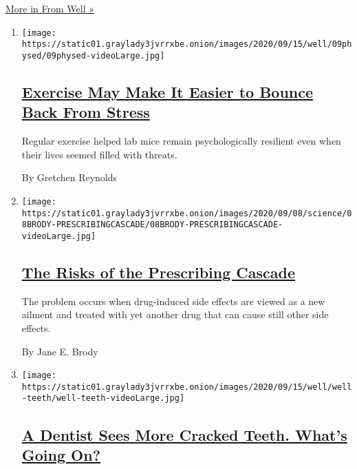 \href{/section/well}{More in From Well »}

\begin{enumerate}
\def\labelenumi{\arabic{enumi}.}
\item
  \texttt{[image: https://static01.graylady3jvrrxbe.onion/images/2020/09/15/well/09physed/09physed-videoLarge.jpg]}

  \hypertarget{exercise-may-make-it-easier-to-bounce-back-from-stress}{%
  \subsection{\texorpdfstring{\href{/2020/09/09/well/move/Exercise-stress-resilience.html}{Exercise
  May Make It Easier to Bounce Back From
  Stress}}{Exercise May Make It Easier to Bounce Back From Stress}}\label{exercise-may-make-it-easier-to-bounce-back-from-stress}}

  Regular exercise helped lab mice remain psychologically resilient even
  when their lives seemed filled with threats.

  By Gretchen Reynolds
\item
  \texttt{[image: https://static01.graylady3jvrrxbe.onion/images/2020/09/08/science/08BRODY-PRESCRIBINGCASCADE/08BRODY-PRESCRIBINGCASCADE-videoLarge.jpg]}

  \hypertarget{the-risks-of-the-prescribing-cascade}{%
  \subsection{\texorpdfstring{\href{/2020/09/07/well/live/prescription-medication-drug-side-effects-cascade.html}{The
  Risks of the Prescribing
  Cascade}}{The Risks of the Prescribing Cascade}}\label{the-risks-of-the-prescribing-cascade}}

  The problem occurs when drug-induced side effects are viewed as a new
  ailment and treated with yet another drug that can cause still other
  side effects.

  By Jane E. Brody
\item
  \texttt{[image: https://static01.graylady3jvrrxbe.onion/images/2020/09/15/well/well-teeth/well-teeth-videoLarge.jpg]}

  \hypertarget{a-dentist-sees-more-cracked-teeth-whats-going-on}{%
  \subsection{\texorpdfstring{\href{/2020/09/08/well/live/dentists-tooth-teeth-cracks-fractures-coronavirus-stress-grinding.html}{A
  Dentist Sees More Cracked Teeth. What's Going
  On?}}{A Dentist Sees More Cracked Teeth. What's Going On?}}\label{a-dentist-sees-more-cracked-teeth-whats-going-on}}


\end{enumerate}
